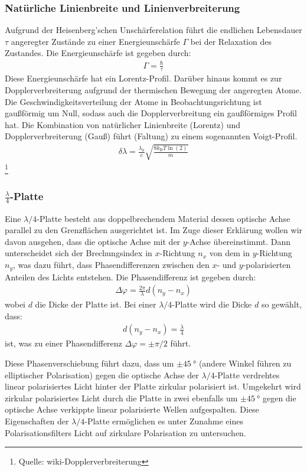 \documentclass[11pt, a4paper]{article}
\begin{document}
\subsubsection{Natürliche Linienbreite und Linienverbreiterung}
Aufgrund der Heisenberg'schen Unschärferelation führt die endlichen Lebensdauer $\tau$ angeregter Zustände zu einer Energieunschärfe $\Gamma$ bei der Relaxation des Zustandes.
Die Energieunschärfe ist gegeben durch:
\begin{align}
	\Gamma = \frac{\hbar}{\tau}
\end{align}
Diese Energieunschärfe hat ein Lorentz-Profil.
Darüber hinaus kommt es zur Dopplerverbreiterung aufgrund der thermischen Bewegung der angeregten Atome.
Die Geschwindigkeitsverteilung der Atome in Beobachtungsrichtung ist gaußförmig um Null, sodass auch die Dopplerverbreitung ein gaußförmiges Profil hat.
Die Kombination von natürlicher Linienbreite (Lorentz) und Dopplerverbreiterung (Gauß) führt (Faltung) zu einem sogenannten Voigt-Profil.
\begin{align}
	\delta \lambda = \frac{\lambda_0}{c} \sqrt{\frac{8 k_\mathrm{B} T \ln(2)}{m}}
\end{align}
\footnote{Quelle: wiki-Dopplerverbreiterung}
\subsubsection{$\frac{\lambda}{4}$-Platte}
Eine $\lambda/4$-Platte besteht aus doppelbrechendem Material dessen optische Achse parallel zu den Grenzflächen ausgerichtet ist.
Im Zuge dieser Erklärung wollen wir davon ausgehen, dass die optische Achse mit der $y$-Achse übereinstimmt.
Dann unterscheidet sich der Brechungsindex in $x$-Richtung $n_x$ von dem in $y$-Richtung $n_y$, was dazu führt, dass Phasendifferenzen zwischen den $x$- und $y$-polarisierten Anteilen des Lichts entstehen.
Die Phasendifferenz ist gegeben durch:
\begin{align}
	\Delta \varphi = \frac{2 \pi}{\lambda} d (n_y - n_x)
\end{align}
wobei $d$ die Dicke der Platte ist.
Bei einer $\lambda / 4$-Platte wird die Dicke $d$ so gewählt, dass:
\begin{align}
	d (n_y - n_x) = \frac{\lambda}{4}
\end{align}
ist, was zu einer Phasendifferenz $\Delta \varphi = \pm \pi / 2$ führt.

Diese Phasenverschiebung führt dazu, dass um $\pm\SI{45}{\degree}$ (andere Winkel führen zu elliptischer Polarisation) gegen die optische Achse der $\lambda/4$-Platte verdrehtes linear polarisiertes Licht hinter der Platte zirkular polarisiert ist.
Umgekehrt wird zirkular polarisiertes Licht durch die Platte in zwei ebenfalls um $\pm\SI{45}{\degree}$ gegen die optische Achse verkippte linear polarisierte Wellen aufgespalten.
Diese Eigenschaften der $\lambda/4$-Platte ermöglichen es unter Zunahme eines Polarisationsfilters Licht auf zirkulare Polarisation zu untersuchen.
\end{document}
